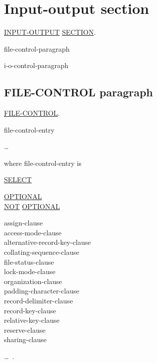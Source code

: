 \documentclass[a4paper,oneside,svgnames]{scrbook}
\makeatletter
\newcommand{\key}[1]{\underline{#1}}
\newcommand{\miscext}[1]{%
  \colorbox{blue!50}{#1}}
\newenvironment{0-1}{$\left[ \begin{tabular}{@{}l@{}}}{\end{tabular} \right]$}
\makeatother
\begin{document}
\section{Input-output section}

\begin{0-1}
  \key{INPUT-OUTPUT} \key{SECTION}.
\end{0-1}\newline
\begin{0-1}
  file-control-paragraph
\end{0-1}\newline
\begin{0-1}
  i-o-control-paragraph
\end{0-1}

\subsection{FILE-CONTROL paragraph}

\begin{0-1}
  \key{FILE-CONTROL}.
\end{0-1}\newline
\begin{0-1}
  file-control-entry
\end{0-1} \ldots

\label{file-control-entry} where file-control-entry is

\key{SELECT}
\begin{0-1}
  \key{OPTIONAL} \\
  \miscext{\key{NOT} \key{OPTIONAL}}
\end{0-1}
\filename
\begin{0-1}
  assign-clause \\
  access-mode-clause \\
  alternative-record-key-clause \\
  collating-sequence-clause \\
  file-status-clause \\
  lock-mode-clause \\
  organization-clause \\
  padding-character-clause \\
  record-delimiter-clause \\
  record-key-clause \\
  relative-key-clause \\
  reserve-clause \\
  sharing-clause
\end{0-1}\ldots\ {}.
\end{document}
